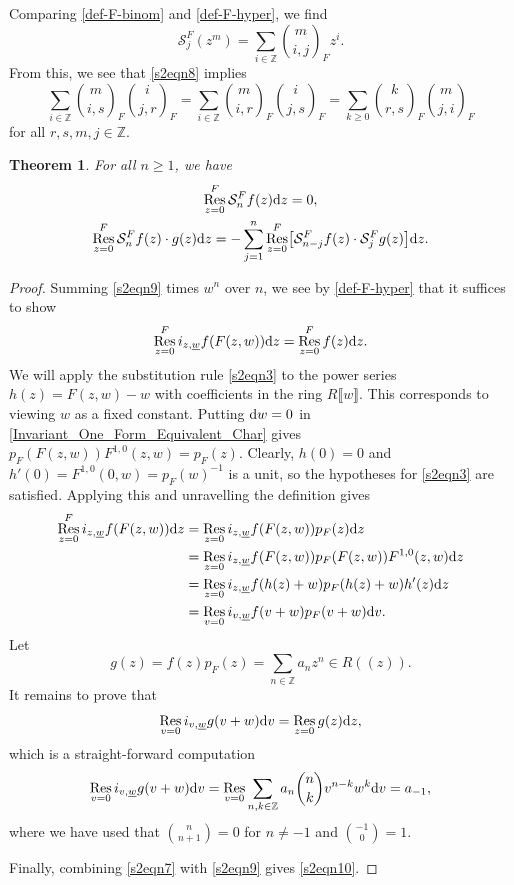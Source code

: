 \documentclass[pdftex]{sigma}
\numberwithin{equation}{section}
\newtheorem{Theorem}{Theorem}[section]
\theoremstyle{definition}
\DeclareMathOperator\Res{Res}
\newcommand\Fbinom[2]{\binom{#1}{#2}_{\!\!F}}
\def\lb{\llbracket}
\def\rb{\rrbracket}
\begin{document}
Comparing \eqref{def-F-binom} and \eqref{def-F-hyper}, we find
\[
 \mathcal{S}_j^F(z^m)=\sum_{i\in\mathbb{Z}}\Fbinom{m}{i,j}z^i.
\]
From this, we see that \eqref{s2eqn8} implies
\[
 \sum_{i\in\mathbb{Z}}\Fbinom{m}{i,s}\Fbinom{i}{j,r}=\sum_{i\in\mathbb{Z}}\Fbinom{m}{i,r}\Fbinom{i}{j,s}=\sum_{k\geqslant0}\Fbinom{k}{r,s}\Fbinom{m}{j,i}
\]
for all $r,s,m,j\in\mathbb{Z}$.

\begin{Theorem}
\label{s2thm1}
For all $n\geqslant1$, we have
\begin{gather}
 \Res^F_{z=0}\mathcal{S}_n^Ff(z){\rm d}z=0,\label{s2eqn9}\\
 \Res^F_{z=0}\mathcal{S}_n^F f(z)\cdot g(z){\rm d}z=-\sum_{j=1}^n \Res_{z=0}^F\bigl[\mathcal{S}_{n-j}^Ff(z)\cdot \mathcal{S}_j^F g(z)\bigr]{\rm d}z.\label{s2eqn10}
\end{gather}
\end{Theorem}

\begin{proof}
 Summing \eqref{s2eqn9} times $w^n$ over $n$, we see by \eqref{def-F-hyper} that it suffices to show
 \[
 \Res^F_{z=0} i_{z,\underline{w}} f(F(z,w)){\rm d}z=\Res^F_{z=0}f(z){\rm d}z.
 \]
 We will apply the substitution rule \eqref{s2eqn3} to the power series $h(z)=F(z,w)-w$ with coefficients in the ring $R\lb w\rb$. This corresponds to viewing $w$ as a fixed constant. Putting ${\rm d}w=0$ in \eqref{Invariant_One_Form_Equivalent_Char} gives $p_F(F(z,w))F^{1,0}(z,w)=p_F(z)$. Clearly, $h(0)=0$ and $h'(0)=F^{1,0}(0,w)=p_F(w)^{-1}$ is a unit, so the hypotheses for \eqref{s2eqn3} are satisfied. Applying this and unravelling the definition gives
 \begin{align*}
 \Res^F_{z=0} i_{z,\underline{w}} f(F(z,w)){\rm d}z&=\Res_{z=0} i_{z,\underline{w}} f(F(z,w))p_F(z){\rm d}z\\
 &=\Res_{z=0} i_{z,\underline{w}} f(F(z,w))p_F(F(z,w))F^{1,0}(z,w){\rm d}z\\
 &=\Res_{z=0} i_{z,\underline{w}} f(h(z)+w)p_F(h(z)+w)h'(z){\rm d}z\\
 &=\Res_{v=0} i_{v,\underline{w}} f(v+w)p_F(v+w){\rm d}v.
 \end{align*}
 Let \[
 g(z)=f(z)p_F(z)=\sum_{n\in\mathbb{Z}}a_nz^n\in R(\!( z)\!).\]
 It remains to prove that
 \[
 \Res_{v=0} i_{v,\underline{w}}g(v+w){\rm d}v=\Res_{z=0}g(z){\rm d}z,
 \]
 which is a straight-forward computation
 \[
 \Res_{v=0} i_{v,\underline{w}}g(v+w){\rm d}v=\Res_{v=0} \sum_{n,k\in\mathbb{Z}}a_n\binom{n}{k}v^{n-k}w^k {\rm d}v=a_{-1},
 \]
 where we have used that $\binom{n}{n+1}=0$ for $n\neq-1$ and $\binom{-1}{0}=1$.

 Finally, combining \eqref{s2eqn7} with \eqref{s2eqn9} gives \eqref{s2eqn10}.
\end{proof}
\end{document}
